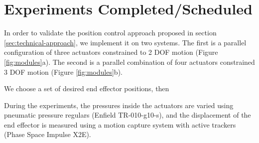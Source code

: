 \section{Experiments Completed/Scheduled}   \label{sec:experiments}

In order to validate the position control approach proposed in section \ref{sec:technical-approach}, we implement it on two systems. The first is a parallel configuration of three actuators constrained to 2 DOF motion (Figure \ref{fig:modules}a). The second is a parallel combination of four actuators constrained 3 DOF motion (Figure \ref{fig:modules}b).

We choose a set of desired end effector positions, then 

During the experiments, the pressures inside the actuators are varied using pneumatic pressure regulars (Enfield TR-010-g10-s), and the displacement of the end effector is measured using a motion capture system with active trackers (Phase Space Impulse X2E).

